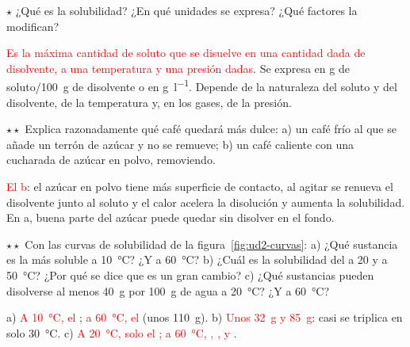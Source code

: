 \begin{exercise}
    \(\star\) ¿Qué es la solubilidad? ¿En qué unidades se expresa? ¿Qué factores la modifican?
    \begin{solu}
        \textcolor{red}{Es la máxima cantidad de soluto que se disuelve en una cantidad dada de disolvente, a una temperatura y una
        presión dadas}. Se expresa en g de soluto/\qty{100}{\gram} de disolvente o en \unit{\gram\per\litre}. Depende de la
        naturaleza del soluto y del disolvente, de la temperatura y, en los gases, de la presión.
    \end{solu}
\end{exercise}

\begin{exercise}
    \(\star\star\) Explica razonadamente qué café quedará más dulce: a) un café frío al que se añade un terrón de azúcar y no se
    remueve; b) un café caliente con una cucharada de azúcar en polvo, removiendo.
    \begin{solu}
        \textcolor{red}{El b}: el azúcar en polvo tiene más superficie de contacto, al agitar se renueva el disolvente junto al
        soluto y el calor acelera la disolución y aumenta la solubilidad. En a, buena parte del azúcar puede quedar sin disolver en
        el fondo.
    \end{solu}
\end{exercise}

\begin{exercise}
    \(\star\star\) Con las curvas de solubilidad de la figura~\ref{fig:ud2-curvas}: a) ¿Qué sustancia es la más soluble a
    \qty{10}{\degreeCelsius}? ¿Y a \qty{60}{\degreeCelsius}? b) ¿Cuál es la solubilidad del  a 20 y a
    \qty{50}{\degreeCelsius}? ¿Por qué se dice que es un gran cambio? c) ¿Qué sustancias pueden disolverse al menos
    \qty{40}{\gram} por \qty{100}{\gram} de agua a \qty{20}{\degreeCelsius}? ¿Y a \qty{60}{\degreeCelsius}?
    \begin{solu}
        a) \textcolor{red}{A \qty{10}{\degreeCelsius}, el }; \textcolor{red}{a \qty{60}{\degreeCelsius}, el }
        (unos \qty{110}{\gram}). b) \textcolor{red}{Unos \qty{32}{\gram} y \qty{85}{\gram}}: casi se triplica en solo
        \qty{30}{\degreeCelsius}. c) \textcolor{red}{A \qty{20}{\degreeCelsius}, solo el ; a \qty{60}{\degreeCelsius},
        , ,  y }.
    \end{solu}
\end{exercise}

